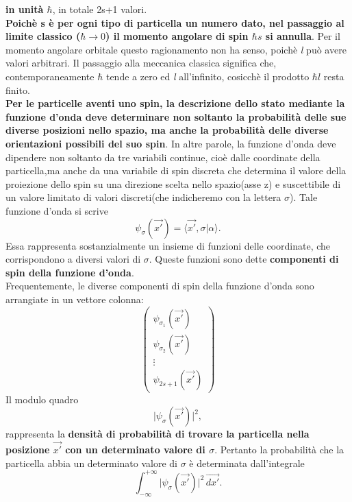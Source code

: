 \documentclass[a4paper,12pt,oneside]{book}
\begin{document}
\textbf{in unità $\hbar$}, in totale 2s+1 valori.\\ \textbf{Poichè s è per ogni tipo di particella un numero dato, nel passaggio al limite classico ($\hbar\rightarrow0$) il momento angolare di spin $\hbar s$ si annulla}. Per il momento angolare orbitale questo ragionamento non ha senso, poichè \textit{l} può avere valori arbitrari. Il passaggio alla meccanica classica significa che, contemporaneamente $\hbar$ tende a zero ed \textit{l} all'infinito, cosicchè il prodotto $\hbar l$ resta finito.\\ \textbf{Per le particelle aventi uno spin, la descrizione dello stato mediante la funzione d'onda deve determinare non soltanto la probabilità delle sue diverse posizioni nello spazio, ma anche la probabilità delle diverse orientazioni possibili del suo spin}.
In altre parole, la funzione d'onda deve dipendere non soltanto da tre variabili continue, cioè dalle coordinate della particella,ma anche da una variabile di spin discreta che determina il valore della proiezione dello spin su una direzione scelta nello spazio(asse z) e suscettibile di un valore limitato di valori discreti(che indicheremo con la lettera $\sigma$). Tale funzione d'onda si scrive
\begin{equation}
\psi_{\sigma}(\vec{x'})=\langle\vec{x'}, \sigma|\alpha\rangle .
\end{equation} 
Essa rappresenta sostanzialmente un insieme di funzioni delle coordinate, che corrispondono a diversi valori di $\sigma$. Queste funzioni sono dette \textbf{componenti di spin della funzione d'onda}.\\ Frequentemente, le diverse componenti di spin della funzione d'onda sono arrangiate in un vettore colonna:
\[
\begin{pmatrix}
\psi_{\sigma_1}(\vec{x'})\\ \psi_{\sigma_2}(\vec{x'})\\ \vdots \\\psi_{2s+1}(\vec{x'})
\end{pmatrix}
\] 
Il modulo quadro 
\begin{equation}
\vert\psi_{\sigma}(\vec{x'})\vert^{2}  , 
\end{equation}
rappresenta la \textbf{densità di probabilità di trovare la particella nella posizione $\vec{x'}$ con un determinato valore di $\sigma$}. Pertanto la probabilità che la particella abbia un determinato valore di $\sigma$ è determinata dall'integrale
\begin{equation}
\int_{-\infty}^{+\infty} \vert\psi_{\sigma}(\vec{x'})\vert^{2}\,\vec{dx'} .
\end{equation}
\end{document}
